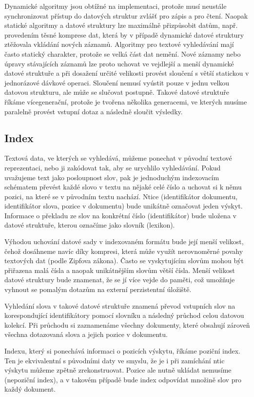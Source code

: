 \documentclass[11pt,letterpaper,oneside,openright]{book}
\begin{document}
Dynamické algoritmy jsou obtížné na implementaci, protože musí neustále
synchronizovat přístup do datových struktur zvlášť pro zápis a pro čtení.
Naopak statické algoritmy a datové struktury lze maximálně přizpůsobit datům,
např. provedením těsné komprese dat, která by v případě dynamické datové
struktury ztěžovala vkládání nových záznamů. Algoritmy pro textové vyhledávání
mají často statický charakter, protože se velká část dat nemění. Nové záznamy
nebo úpravy stávajících záznamů lze proto uchovat ve vejdlejší a menší
dynamické datové struktuře a při dosažení určité velikosti provést sloučení s
větší statickou v jednorázové dávkové operaci. Sloučení nemusí vyústit pouze v
jednu velkou datovou strukturu, ale může se slučovat postupně. Takové datové
struktuře říkáme vícegenerační, protože je tvořena několika generacemi, ve
kterých musíme paralelně provést vstupní dotaz a následně sloučit výsledky.

\subsection{Index}
Textová data, ve kterých se vyhledává, můžeme ponechat v původní textové
reprezentaci, nebo ji zakódovat tak, aby se urychlilo vyhledávání. Pokud
uvažujeme text jako posloupnost slov, pak je jednoduchým indexovacím schématem
převést každé slovo v textu na nějaké celé číslo a uchovat si k němu pozici, na
které se v původním textu nachází. Ntice (identifikátor dokumentu,
identifikátor slova, pozice v dokumentu) bude unikátně označovat jeden výskyt.
Informace o překladu ze slov na konkrétní číslo (identifikátor) bude uložena v
datové struktuře, kterou označíme jako slovník (lexikon).

Výhodou uchování datové sady v indexovaném formátu bude její menší velikost,
čehož dosáhneme navíc díky kompresi, která může využít nerovnoměrné povahy
textových dat (podle Zipfova zákona). Často se vyskytujícím slovům mohou být
přiřazena malá čísla a naopak unikátnějším slovům větší čísla. Menší velikost
datové struktury bude znamenat, že se jí více vejde do paměti, což umožňuje
vyhnout se pomalým dotazům na externí perzistentní úložiště.

Vyhledání slova v takové datové struktuře znamená převod vstupních slov na
korespondující identifikátory pomocí slovníku a následný průchod celou datovou
kolekcí. Při průchodu si zaznamenáme všechny dokumenty, které obsahují zároveň
všechna dotazovaná slova a jejich pozice v dokumentu.

Indexu, který si ponechává informaci o pozicích výskytu, říkáme poziční index.
Ten je ekvivalentní s původními daty ve smyslu, že je i při zamíchání ntic
výskytu můžeme zpětně zrekonstruovat. Pozice ale nutně ukládat nemusíme
(nepoziční index), a v takovém případě bude index odpovídat množině slov pro
každý dokument.
\end{document}
